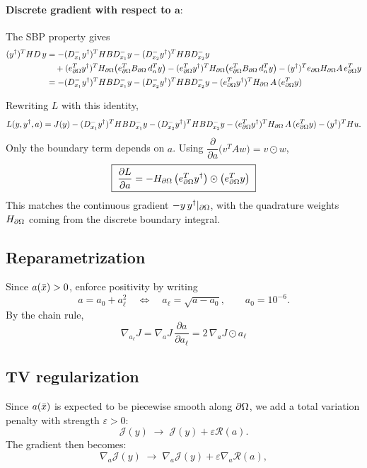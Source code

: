 \paragraph{Discrete gradient with respect to $\mathbf{a}:$}
The SBP property gives
\begin{align*}
(y^{\dagger})^TH D\,y
&=-(D_{x_1}^{-}y^{\dagger})^TH B D_{x_1}^{-}y-(D_{x_2}^{-}y^{\dagger})^TH B D_{x_2}^{-}y \nonumber\\
&\quad+(e_{\partial\Omega}^Ty^{\dagger})^TH_{\partial\Omega}\big(e_{\partial\Omega}^TB_{\partial\Omega}\,d_n^Ty\big)-(e_{\partial\Omega}^Ty^{\dagger})^TH_{\partial\Omega}\big(e_{\partial\Omega}^TB_{\partial\Omega}\,d_n^Ty\big)-(y^{\dagger})^Te_{\partial\Omega}H_{\partial\Omega} A\,e_{\partial\Omega}^Ty \\
&=-(D_{x_1}^{-}y^{\dagger})^THBD_{x_1}^{-}y-(D_{x_2}^{-}y^{\dagger})^THBD_{x_2}^{-}y
-(e_{\partial\Omega}^Ty^{\dagger})^TH_{\partial\Omega}\,A\,(e_{\partial\Omega}^Ty)
\end{align*}

Rewriting $L$ with this identity,
\begin{equation*}
L(y,y^{\dagger},a)=J(y)-(D_{x_1}^{-}y^{\dagger})^THBD_{x_1}^{-}y-(D_{x_2}^{-}y^{\dagger})^THBD_{x_2}^{-}y
-(e_{\partial\Omega}^Ty^{\dagger})^TH_{\partial\Omega}\,A\,(e_{\partial\Omega}^Ty)-(y^{\dagger})^THu .
\end{equation*}
Only the boundary term depends on $a$. Using $\dfrac{\partial}{\partial a}\big(v^TAw\big)=v\odot w$,
\begin{equation}
\boxed{\;\frac{\partial L}{\partial a}=-H_{\partial\Omega}\,\big(e_{\partial\Omega}^Ty^{\dagger}\big)\odot\big(e_{\partial\Omega}^Ty\big)\;}
\end{equation}
This matches the continuous gradient $-y\,y^{\dagger}|_{\partial\Omega}$, with the quadrature weights $H_{\partial\Omega}$
coming from the discrete boundary integral.

\subsection{Reparametrization}
Since $a(\bar{x})>0$, enforce positivity by writing
\begin{equation}
a=a_0+a_\ell^{2}
\quad\Longleftrightarrow\quad
a_\ell=\sqrt{a-a_0},\qquad a_0=10^{-6}.
\label{eq:p1_reparametrization}
\end{equation}
By the chain rule,
\begin{equation}
\nabla_{a_\ell}J=\nabla_aJ \, \frac{\partial a}{\partial a_\ell}=2\,\nabla_aJ\odot a_\ell
\end{equation}

\subsection{TV regularization}
Since $a(\bar{x})$ is expected to be piecewise smooth along $\partial\Omega$, we add a total
variation penalty with strength $\varepsilon>0$:
\begin{equation}
\mathcal{J}(y)\;\longrightarrow\;\mathcal{J}(y)+\varepsilon\mathcal{R}(a).
\end{equation}
The gradient then becomes:
\begin{equation}
\nabla_a\mathcal{J}(y)\;\longrightarrow\;\nabla_a\mathcal{J}(y)+\varepsilon\nabla_a\mathcal{R}(a),
\end{equation}
